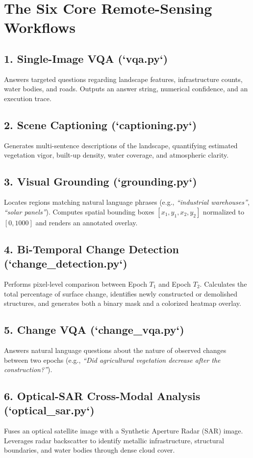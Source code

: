 \documentclass[12pt,a4paper]{report}
\begin{document}
\section{The Six Core Remote-Sensing Workflows}

\subsection{1. Single-Image VQA (`vqa.py`)}
Answers targeted questions regarding landscape features, infrastructure counts, water bodies, and roads. Outputs an answer string, numerical confidence, and an execution trace.

\subsection{2. Scene Captioning (`captioning.py`)}
Generates multi-sentence descriptions of the landscape, quantifying estimated vegetation vigor, built-up density, water coverage, and atmospheric clarity.

\subsection{3. Visual Grounding (`grounding.py`)}
Locates regions matching natural language phrases (e.g., \textit{``industrial warehouses''}, \textit{``solar panels''}). Computes spatial bounding boxes $[x_1, y_1, x_2, y_2]$ normalized to $[0, 1000]$ and renders an annotated overlay.

\subsection{4. Bi-Temporal Change Detection (`change_detection.py`)}
Performs pixel-level comparison between Epoch $T_1$ and Epoch $T_2$. Calculates the total percentage of surface change, identifies newly constructed or demolished structures, and generates both a binary mask and a colorized heatmap overlay.

\subsection{5. Change VQA (`change_vqa.py`)}
Answers natural language questions about the nature of observed changes between two epochs (e.g., \textit{``Did agricultural vegetation decrease after the construction?''}).

\subsection{6. Optical-SAR Cross-Modal Analysis (`optical_sar.py`)}
Fuses an optical satellite image with a Synthetic Aperture Radar (SAR) image. Leverages radar backscatter to identify metallic infrastructure, structural boundaries, and water bodies through dense cloud cover.
\end{document}
